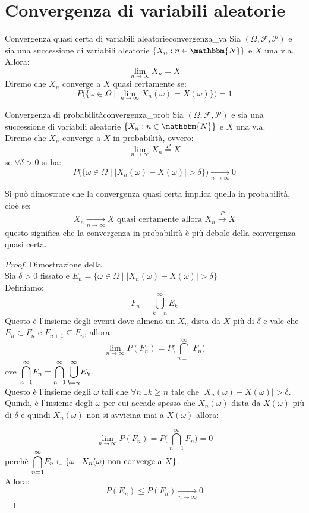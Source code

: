 \documentclass[12pt]{report}
\newcounter{definition}
\newcommand{\namerefl}[1]{%
	\bgroup
	\let\nmu\MakeLowercase
	\nameref{#1}\egroup}
\newcommand{\nmu}{}
\begin{document}
	 \section{Convergenza di variabili aleatorie}
	 \begin{definition}{\nmu Convergenza quasi certa di variabili aleatorie}{convergenza_va}
	 	Sia $(\Omega, \mathcal{F}, \mathcal{P})$ e sia una successione di variabili aleatorie $\{X_n : n\in \mathbbm{N}\}$ e $X$ una v.a. \\
	 	Allora:
	 	\[
	 	\lim_{n\to\infty}X_n = X
	 	\]
	 	Diremo che $X_n$ converge a $X$ quasi certamente se:
	 	\[
	 	P\Big(\{\omega \in \Omega \mid \lim_{n \to \infty}X_n(\omega) = X(\omega)\}\Big) = 1
	 	\]
	 \end{definition}
	 \begin{definition}{\nmu Convergenza di probabilità}{convergenza_prob}
	 	Sia $(\Omega, \mathcal{F}, \mathcal{P})$ e sia una successione di variabili aleatorie $\{X_n : n\in\mathbbm{N}\}$ e $X$ una v.a. \\
	 	Diremo che $X_n$ converge a $X$ in probabilità, ovvero:
	 	\[
	 	\lim_{n\to\infty}X_n \overset{P}{=} X
	 	\]
	 	se $\forall \delta > 0$ si ha:
	 	\[
	 	P\Big(\{\omega \in \Omega \mid \Big|X_n(\omega) - X(\omega)\Big| > \delta\}\Big)\underset{n \to \infty}{\longrightarrow} 0
	 	\]
	 \end{definition}
	 	Si può dimostrare che la convergenza quasi certa implica quella in probabilità, cioè se:
	 	\[
	 	X_n \underset{n\to\infty}{\longrightarrow} X \text{ quasi certamente allora } X_n \overset{P}{\longrightarrow} X
	 	\]
	 	questo significa che la convergenza in probabilità è più debole della convergenza quasi certa.
	 \begin{proof}{Dimostrazione della \namerefl{def:convergenza_prob}} \quad \\
	 	Sia $\delta > 0$ fissato e $E_n = \Big\{ \omega \in \Omega \mid \Big |X_n(\omega) - X(\omega)\Big| > \delta\Big\}$ \\
	 	Definiamo:
	 	\[
	 	F_n = \bigcup_{k=n}^{\infty}E_k
	 	\]
	 	Questo è l'insieme degli eventi dove almeno un $X_n$ dista da $X$ più di $\delta$ e vale che $E_n \subset F_n$ e $F_{n+1} \subseteq F_n$, allora:
	 	\[
	 	\lim_{n \to \infty}P(F_n) = P\Bigg(\bigcap_{n=1}^{\infty}F_n\Bigg)
	 	\]
	 	ove $\mathlarger{\bigcap_{n=1}^{\infty}}F_n = \mathlarger{\bigcap_{n=1}^{\infty}\bigcup_{k=n}^{\infty}}E_k$. \\
	 	Questo è l'insieme degli $\omega$ tali che $\forall n\ \exists k \geq n$ tale che $\Big|X_n(\omega) - X(\omega)\Big| > \delta$. \\
	 	Quindi, è l'insieme degli $\omega$ per cui accade spesso che $X_n(\omega)$ dista da $X(\omega)$ più di $\delta$ e quindi $X_n(\omega)$ non si avvicina mai a $X(\omega)$ allora:

	 	\[\lim_{n \to \infty} P(F_n) = P\Bigg(\bigcap_{n=1}^{\infty}F_n\Bigg) = 0\]
	 	perchè $\mathlarger{\bigcap_{n=1}^{\infty}}F_n \subset \{\omega\mid X_n(\omega) \text{ non converge a } X\}$. \\
	 	Allora:
	 	\[
	 	P(E_n) \leq P(F_n) \underset{n \to \infty}{\longrightarrow} 0
	 	\]
	 \end{proof}
\end{document}
